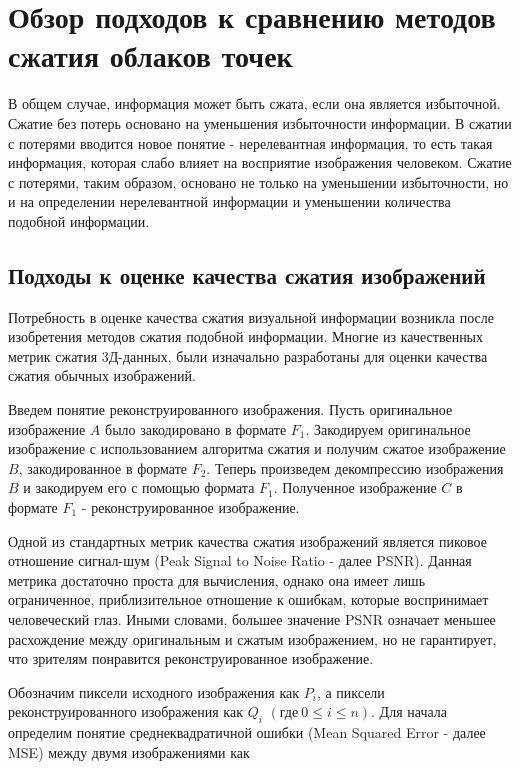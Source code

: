 \chapter{Обзор подходов к сравнению методов сжатия облаков точек}


В общем случае, информация может быть сжата, если она является избыточной.
Сжатие без потерь основано на уменьшения избыточности информации. В сжатии с
потерями вводится новое понятие - нерелевантная информация, то есть такая
информация, которая слабо влияет на восприятие изображения человеком. Сжатие с
потерями, таким образом, основано не только на уменьшении избыточности, но и на
определении нерелевантной информации и уменьшении количества подобной
информации\cite[265]{DataCompression}.


\section{Подходы к оценке качества сжатия изображений}

Потребность в оценке качества сжатия визуальной информации возникла после
изобретения методов сжатия подобной информации. Многие из качественных метрик
сжатия 3Д-данных, были изначально разработаны для оценки качества сжатия обычных
изображений.

Введем понятие реконструированного изображения. Пусть оригинальное изображение
$A$ было закодировано в формате $F_{1}$. Закодируем оригинальное изображение с
использованием алгоритма сжатия и получим сжатое изображение $B$, закодированное
в формате $F_{2}$. Теперь произведем декомпрессию изображения $B$ и закодируем
его с помощью формата $F_{1}$. Полученное изображение $C$ в формате $F_{1}$ -
реконструированное изображение.

Одной из стандартных метрик качества сжатия изображений является пиковое
отношение сигнал-шум (Peak Signal to Noise Ratio - далее PSNR). Данная метрика
достаточно проста для вычисления, однако она имеет лишь ограниченное,
приблизительное отношение к ошибкам, которые воспринимает человеческий глаз.
Иными словами, большее значение PSNR означает меньшее расхождение между
оригинальным и сжатым изображением, но не гарантирует, что зрителям понравится
реконструированное изображение\cite[279]{DataCompression}.

Обозначим пиксели исходного изображения как $P_{i}$, а пиксели
реконструированного изображения как $Q_{i}$ $\left(\text{где} \ 0 \le i \le
n\right)$. Для начала определим понятие среднеквадратичной ошибки (Mean Squared
Error - далее MSE) между двумя изображениями как

